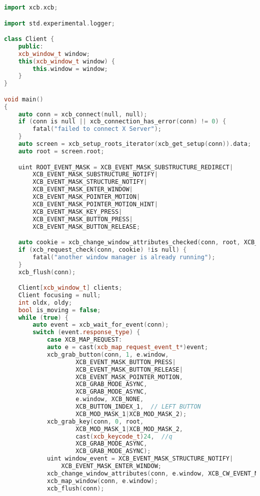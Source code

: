 \documentclass[12pt,a4paper]{jsarticle}
\begin{document}
\begin{lstlisting}[language=C++]
import xcb.xcb;

import std.experimental.logger;

class Client {
	public:
	xcb_window_t window;
	this(xcb_window_t window) {
		this.window = window;
	}
}

void main()
{
	auto conn = xcb_connect(null, null);
	if (conn is null || xcb_connection_has_error(conn) != 0) {
		fatal("failed to connect X Server");
	}
	auto screen = xcb_setup_roots_iterator(xcb_get_setup(conn)).data;
	auto root = screen.root;

	uint ROOT_EVENT_MASK = XCB_EVENT_MASK_SUBSTRUCTURE_REDIRECT|
		XCB_EVENT_MASK_SUBSTRUCTURE_NOTIFY|
		XCB_EVENT_MASK_STRUCTURE_NOTIFY|
		XCB_EVENT_MASK_ENTER_WINDOW|
		XCB_EVENT_MASK_POINTER_MOTION|
		XCB_EVENT_MASK_POINTER_MOTION_HINT|
		XCB_EVENT_MASK_KEY_PRESS|
		XCB_EVENT_MASK_BUTTON_PRESS|
		XCB_EVENT_MASK_BUTTON_RELEASE;

	auto cookie = xcb_change_window_attributes_checked(conn, root, XCB_CW_EVENT_MASK, &ROOT_EVENT_MASK);
	if (xcb_request_check(conn, cookie) !is null) {
		fatal("another window manager is already running");		
	}
	xcb_flush(conn);

	Client[xcb_window_t] clients;
	Client focusing = null;
	int oldx, oldy;
	bool is_moving = false;
	while (true) {
		auto event = xcb_wait_for_event(conn);
		switch (event.response_type) {
			case XCB_MAP_REQUEST:
			auto e = cast(xcb_map_request_event_t*)event;
			xcb_grab_button(conn, 1, e.window,
					XCB_EVENT_MASK_BUTTON_PRESS|
					XCB_EVENT_MASK_BUTTON_RELEASE|
					XCB_EVENT_MASK_POINTER_MOTION,
					XCB_GRAB_MODE_ASYNC,
					XCB_GRAB_MODE_ASYNC,
					e.window, XCB_NONE,
					XCB_BUTTON_INDEX_1,  // LEFT BUTTON
					XCB_MOD_MASK_1|XCB_MOD_MASK_2);
			xcb_grab_key(conn, 0, root,
					XCB_MOD_MASK_1|XCB_MOD_MASK_2,
					cast(xcb_keycode_t)24,  //q
					XCB_GRAB_MODE_ASYNC,
					XCB_GRAB_MODE_ASYNC);
			uint window_event = XCB_EVENT_MASK_STRUCTURE_NOTIFY|
				XCB_EVENT_MASK_ENTER_WINDOW;
			xcb_change_window_attributes(conn, e.window, XCB_CW_EVENT_MASK, &window_event);
			xcb_map_window(conn, e.window);
			xcb_flush(conn);


\end{lstlisting}
\end{document}
